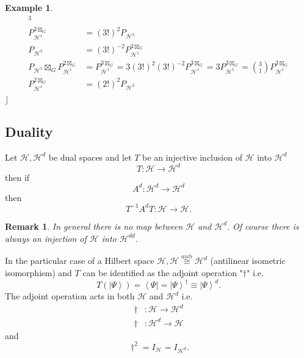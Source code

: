 \documentclass[aps,preprint]{revtex4}%
\newtheorem{example}[theorem]{Example}
\newtheorem{remark}[theorem]{Remark}
\begin{document}
\begin{example}
\begin{align}
{^{3}}\\
P_{\mathcal{H}^{1}}^{3\boxtimes_{G}}  &  =\left(  3!\right)  ^{2}%
P_{\mathcal{H}^{3}}\\
P_{\mathcal{H}^{3}}  &  =\left(  3!\right)  ^{-2}P_{\mathcal{H}^{1}%
}^{3\boxtimes_{G}}\\
P_{\mathcal{H}^{1}}\boxtimes_{G}P_{\mathcal{H}^{1}}^{2\boxtimes_{G}}  &
=P_{\mathcal{H}^{1}}^{3\boxtimes_{G}}=3\left(  3!\right)  ^{2}\left(
3!\right)  ^{-2}P_{\mathcal{H}^{1}}^{3\boxtimes_{G}}=3P_{\mathcal{H}^{1}%
}^{3\boxtimes_{G}}=\binom{3}{1}P_{\mathcal{H}^{1}}^{3\boxtimes_{G}}\\
P_{\mathcal{H}^{1}}^{2\boxtimes_{G}}  &  =\left(  2!\right)  ^{2}%
P_{\mathcal{H}^{2}}%
\end{align}
$\rfloor$
\end{example}

\subsection{Duality}

Let $\mathcal{H},\mathcal{H}^{d}$ be dual spaces and let $T$ be an injective
inclusion of $\mathcal{H}$ into $\mathcal{H}^{d}$
\begin{equation}
T:\mathcal{H}\rightarrow\mathcal{H}^{d}%
\end{equation}
then if
\begin{equation}
A^{d}:\mathcal{H}^{d}\rightarrow\mathcal{H}^{d}%
\end{equation}
then
\begin{equation}
T^{-1}A^{d}T:\mathcal{H}\rightarrow\mathcal{H}.
\end{equation}


\begin{remark}
In general there is \emph{no }map between $\mathcal{H}$ and $\mathcal{H}^{d}.$
Of course there is always an injection of $\mathcal{H}$ into $\mathcal{H}%
^{dd}.$
\end{remark}

In the particular case of a Hilbert space $\mathcal{H},\mathcal{H}%
\overset{anti}{\mathcal{\cong}}\mathcal{H}^{d}$ (antilinear isometric
isomorphism) and $T$ can be identified as the adjoint operation "$\dagger$"
i.e.%
\begin{equation}
T\left(  \left\vert \Psi\right\rangle \right)  =\left\langle \Psi\right\vert
=\left\vert \Psi\right\rangle ^{\dagger}\equiv\left\vert \Psi\right\rangle
^{d}.
\end{equation}
The adjoint operation acts in both $\mathcal{H}$ and $\mathcal{H}^{d}$ i.e.%
\begin{align}
\dagger &  :\mathcal{H}\rightarrow\mathcal{H}^{d}\\
\dagger &  :\mathcal{H}^{d}\rightarrow\mathcal{H}%
\end{align}
and
\begin{equation}
\dagger^{2}=I_{\mathcal{H}}=I_{\mathcal{H}^{d}}.
\end{equation}
\end{document}
